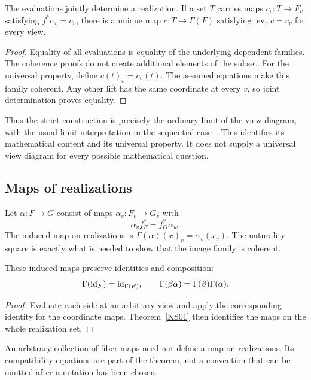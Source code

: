 \begin{theorem}\label{KS01}
The evaluations jointly determine a realization. If a set \(T\) carries maps \(c_v:T\to F_v\) satisfying \(f^*c_w=c_v\), there is a unique map \(c:T\to\Gamma(F)\) satisfying \(\operatorname{ev}_v c=c_v\) for every view.
\end{theorem}
\begin{proof}
Equality of all evaluations is equality of the underlying dependent families. The coherence proofs do not create additional elements of the subset. For the universal property, define \(c(t)_v=c_v(t)\). The assumed equations make this family coherent. Any other lift has the same coordinate at every \(v\), so joint determination proves equality.
\end{proof}
Thus the strict construction is precisely the ordinary limit of the view diagram, with the usual limit interpretation in the sequential case~\cite{stacks-limits}. This identifies its mathematical content and its universal property. It does not supply a universal view diagram for every possible mathematical question.


\subsection{Maps of realizations}
Let \(\alpha:F\to G\) consist of maps \(\alpha_v:F_v\to G_v\) with
\[
 \alpha_v f_F^*=f_G^*\alpha_w.
\]
The induced map on realizations is \(\Gamma(\alpha)(x)_v=\alpha_v(x_v)\). The naturality square is exactly what is needed to show that the image family is coherent.

\begin{proposition}\label{KS02}
These induced maps preserve identities and composition:
\[
 \Gamma(\operatorname{id}_F)=\operatorname{id}_{\Gamma(F)},\qquad
 \Gamma(\beta\alpha)=\Gamma(\beta)\Gamma(\alpha).
\]
\end{proposition}
\begin{proof}
Evaluate each side at an arbitrary view and apply the corresponding identity for the coordinate maps. Theorem~\ref{KS01} then identifies the maps on the whole realization set.
\end{proof}
An arbitrary collection of fiber maps need not define a map on realizations. Its compatibility equations are part of the theorem, not a convention that can be omitted after a notation has been chosen.

